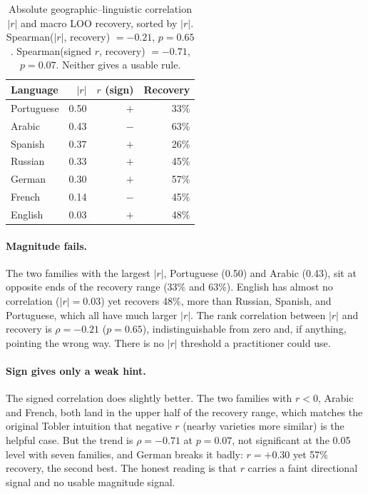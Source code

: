 \documentclass[11pt]{article}
\begin{document}
\begin{table}[t]
\centering
\small
\setlength{\tabcolsep}{5pt}
\begin{tabular}{lrrr}
\toprule
\textbf{Language} & $|r|$ & $r$ (sign) & \textbf{Recovery} \\
\midrule
Portuguese & 0.50 & $+$ & 33\% \\
Arabic     & 0.43 & $-$ & 63\% \\
Spanish    & 0.37 & $+$ & 26\% \\
Russian    & 0.33 & $+$ & 45\% \\
German     & 0.30 & $+$ & 57\% \\
French     & 0.14 & $-$ & 45\% \\
English    & 0.03 & $+$ & 48\% \\
\bottomrule
\end{tabular}
\caption{Absolute geographic--linguistic correlation $|r|$ and macro LOO recovery, sorted by $|r|$.
  Spearman($|r|$, recovery) $={-}0.21$, $p{=}0.65$.
  Spearman(signed $r$, recovery) $={-}0.71$, $p{=}0.07$.
  Neither gives a usable rule.}
\label{tab:abs_r}
\end{table}

\paragraph{Magnitude fails.}
The two families with the largest $|r|$, Portuguese (0.50) and Arabic (0.43), sit at opposite ends of the recovery range (33\% and 63\%).
English has almost no correlation ($|r|{=}0.03$) yet recovers 48\%, more than Russian, Spanish, and Portuguese, which all have much larger $|r|$.
The rank correlation between $|r|$ and recovery is $\rho{=}{-}0.21$ ($p{=}0.65$), indistinguishable from zero and, if anything, pointing the wrong way.
There is no $|r|$ threshold a practitioner could use.

\paragraph{Sign gives only a weak hint.}
The signed correlation does slightly better.
The two families with $r{<}0$, Arabic and French, both land in the upper half of the recovery range, which matches the original Tobler intuition that negative $r$ (nearby varieties more similar) is the helpful case.
But the trend is $\rho{=}{-}0.71$ at $p{=}0.07$, not significant at the 0.05 level with seven families, and German breaks it badly: $r{=}{+}0.30$ yet 57\% recovery, the second best.
The honest reading is that $r$ carries a faint directional signal and no usable magnitude signal.
\end{document}
